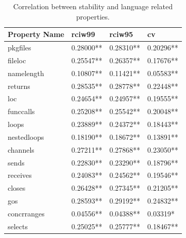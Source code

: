 \documentclass{seal_thesis}
\begin{document}
\begin{table}[H]
	\centering
	\caption{Correlation between stability and language related properties.}
	\label{table:languageproperties}
	\begin{tabular}{@{}llll@{}}
		Property Name & rciw99 & rciw95 & cv \\
		\toprule
		pkgfiles & \cellcolor[HTML]{FFCC99}0.28000** & \cellcolor[HTML]{FFCC99}0.28310** & \cellcolor[HTML]{99CCFF}0.20296** \\
		fileloc & \cellcolor[HTML]{FFCC99}0.25547** & \cellcolor[HTML]{FFCC99}0.26357** & \cellcolor[HTML]{99CCFF}0.17676** \\
		namelength & \cellcolor[HTML]{99CCFF}0.10807** & \cellcolor[HTML]{99CCFF}0.11421** & \cellcolor[HTML]{3366FF}0.05583** \\
		returns & \cellcolor[HTML]{FFCC99}0.28535** & \cellcolor[HTML]{FFCC99}0.28778** & \cellcolor[HTML]{C0C0C0}0.22448** \\
		loc & \cellcolor[HTML]{C0C0C0}0.24654** & \cellcolor[HTML]{C0C0C0}0.24957** & \cellcolor[HTML]{99CCFF}0.19555** \\
		funccalls & \cellcolor[HTML]{C0C0C0}0.25208** & \cellcolor[HTML]{FFCC99}0.25542** & \cellcolor[HTML]{99CCFF}0.20048** \\
		loops & \cellcolor[HTML]{C0C0C0}0.23889** & \cellcolor[HTML]{C0C0C0}0.24372** & \cellcolor[HTML]{99CCFF}0.18443** \\
		nestedloops & \cellcolor[HTML]{99CCFF}0.18190** & \cellcolor[HTML]{99CCFF}0.18672** & \cellcolor[HTML]{99CCFF}0.13891** \\
		channels & \cellcolor[HTML]{FFCC99}0.27211** & \cellcolor[HTML]{FFCC99}0.27868** & \cellcolor[HTML]{C0C0C0}0.23050** \\
		sends & \cellcolor[HTML]{C0C0C0}0.22830** & \cellcolor[HTML]{C0C0C0}0.23290** & \cellcolor[HTML]{99CCFF}0.18796** \\
		receives & \cellcolor[HTML]{C0C0C0}0.24083** & \cellcolor[HTML]{C0C0C0}0.24562** & \cellcolor[HTML]{99CCFF}0.19546** \\
		closes & \cellcolor[HTML]{FFCC99}0.26428** & \cellcolor[HTML]{FFCC99}0.27345** & \cellcolor[HTML]{99CCFF}0.21205** \\
		gos & \cellcolor[HTML]{FFCC99}0.28593** & \cellcolor[HTML]{FFCC99}0.29192** & \cellcolor[HTML]{C0C0C0}0.24832** \\
		concrranges & \cellcolor[HTML]{3366FF}0.04556** & \cellcolor[HTML]{3366FF}0.04388** & \cellcolor[HTML]{3366FF}0.03319* \\
		selects & \cellcolor[HTML]{C0C0C0}0.25025** & \cellcolor[HTML]{FFCC99}0.25777** & \cellcolor[HTML]{99CCFF}0.18467** \\

\end{tabular}
\end{table}
\end{document}
